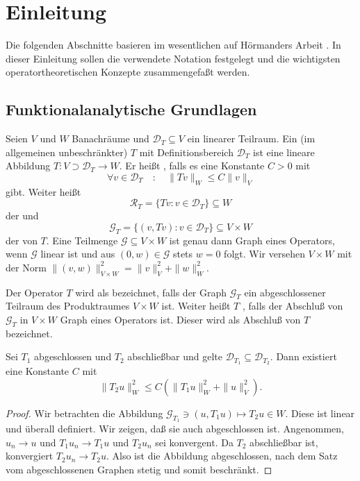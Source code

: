 \chapter{Einleitung}
Die folgenden Abschnitte basieren im wesentlichen auf Hörmanders Arbeit \cite{Hormander:1955}. In dieser Einleitung sollen die verwendete Notation festgelegt und die wichtigsten operatortheoretischen Konzepte zusammengefaßt werden.

\section{Funktionalanalytische Grundlagen}

Seien $V$ und $W$ Banachräume und $\mathcal D_T\subseteq V$ ein linearer Teilraum. Ein (im allgemeinen unbeschr\"ankter)  $T$ mit Definitionsbereich $\mathcal D_T$ ist eine lineare Abbildung $T:V\supset\mathcal D_T \to W$. Er heißt , falls es eine Konstante $C>0$ mit 
\begin{equation}
\forall v\in\mathcal D_T \quad:\quad \|Tv \|_W \le C \|v\|_V
\end{equation}
gibt. Weiter heißt
\begin{equation}
\mathcal R_T = \{ Tv : v\in \mathcal D_T \} \subseteq W
\end{equation}
der  und 
\begin{equation}
\mathcal G_T = \{ (v,Tv) : v \in \mathcal D_T \} \subseteq V\times W 
\end{equation}
der  von $T$. Eine Teilmenge $\mathcal G\subseteq V\times W$ ist genau dann Graph eines Operators, wenn $\mathcal G$ linear ist und aus
$(0,w)\in\mathcal G$ stets $w=0$ folgt. Wir versehen $V\times W$ mit der Norm $\|(v,w)\|_{V\times W}^2 = \|v\|_V^2 + \|w\|_W^2$.


Der Operator $T$ wird als  bezeichnet, falls der Graph $\mathcal G_T$ ein abgeschlossener Teilraum des Produktraumes $V\times W$ ist. Weiter heißt $T$ , falls der Abschluß von $\mathcal G_T$ in $V\times W$ Graph eines Operators ist. Dieser wird als Abschluß von $T$ bezeichnet.

\begin{thm}\label{thm:1:1.1}
Sei $T_1$ abgeschlossen und $T_2$ abschließbar und gelte $\mathcal D_{T_1}\subseteq \mathcal D_{T_2}$. Dann existiert eine Konstante $C$ mit  
\begin{equation}
   \| T_2 u\|_W^2 \le C ( \|T_1 u\|_W^2 + \|u\|_V^2 ). 
\end{equation}
\end{thm}
\begin{proof}
Wir betrachten die Abbildung $\mathcal G_{T_1} \ni (u,T_1u) \mapsto T_2 u \in W$. Diese ist linear und überall definiert. Wir zeigen, daß sie auch abgeschlossen ist. Angenommen, $u_n\to u$ und $T_1 u_n\to T_1 u$ und $T_2 u_n$ sei konvergent. Da $T_2$ abschließbar ist, konvergiert $T_2 u_n \to T_2 u$. Also ist die Abbildung abgeschlossen, nach dem Satz vom abgeschlossenen Graphen stetig und somit beschr\"ankt.
\end{proof}

